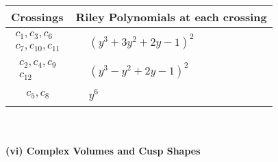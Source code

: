\documentclass[1p]{elsarticle_modified}
\theoremstyle{definition}
\begin{document}
\begin{tabular}{m{50pt}|m{274pt}}
Crossings & \hspace{64pt}Riley Polynomials at each crossing \\
\hline $$\begin{aligned}c_{1},c_{3},c_{6}\\c_{7},c_{10},c_{11}\end{aligned}$$&$\begin{aligned}
&(y^3+3 y^2+2 y-1)^2
\end{aligned}$\\
\hline $$\begin{aligned}c_{2},c_{4},c_{9}\\c_{12}\end{aligned}$$&$\begin{aligned}
&(y^3- y^2+2 y-1)^2
\end{aligned}$\\
\hline $$\begin{aligned}c_{5},c_{8}\end{aligned}$$&$\begin{aligned}
&y^6
\end{aligned}$\\
\hline
\end{tabular}\\~\\
\newpage\flushleft \textbf{(vi) Complex Volumes and Cusp Shapes}
\end{document}
